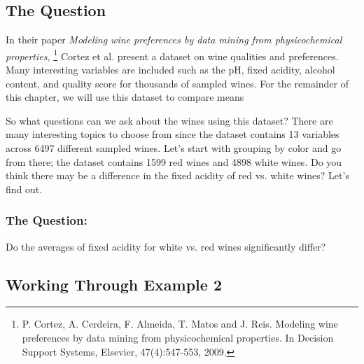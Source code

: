 \documentclass[11pt, chapterprefix=true]{scrbook}\usepackage[]{graphicx}\usepackage[]{color}
\begin{document}
\subsection{The Question}

In their paper \textit{Modeling wine preferences by data mining from physicochemical properties,} \footnote{ P. Cortez, A. Cerdeira, F. Almeida, T. Matos and J. Reis. Modeling wine preferences by data mining from physicochemical properties.  In Decision Support Systems, Elsevier, 47(4):547-553, 2009.}
Cortez et al. present a dataset on wine qualities and preferences. Many interesting variables
are included such as the pH, fixed acidity, alcohol content, and quality score for thousands of 
sampled wines. For the remainder of this chapter, we will use this dataset to compare means 


So what questions can we ask about the wines using this dataset? There are many interesting topics to choose from since the dataset contains 13 variables across 6497 different sampled wines. Let’s start with grouping by color and go from there; the dataset contains 1599 red wines and 4898 white wines. Do you think there may be a difference in the fixed acidity of red vs. white wines? Let’s find out.

\subsubsection{The Question:}  Do the averages of fixed acidity for white vs. red wines significantly differ?

\subsection{Working Through Example 2}
\end{document}
